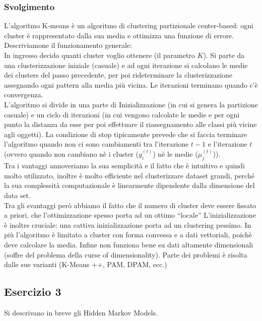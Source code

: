 \documentclass{article}
\begin{document}
\subsubsection*{Svolgimento}
L'algoritmo K-means è un algoritmo di clustering partizionale center-based: ogni cluster è rappresentato dalla sua media e ottimizza una funzione di errore. Descriviamone il funzionamento generale:\\
In ingresso decido quanti cluster voglio ottenere (il parametro $K$). Si parte da una clusterizzazione iniziale (casuale) e ad ogni iterazione si calcolano le medie dei clusters del passo precedente, per poi rideterminare la clusterizzazione assegnando ogni pattern alla media più vicina. Le iterazioni terminano quando c'è convergenza. \\
L'algoritmo si divide in una parte di Inizializzazione (in cui si genera la partizione casuale) e un ciclo di iterazioni (in cui vengono calcolate le medie e per ogni punto la distanza da esse per poi effettuare il riassegnamento alle classi più vicine agli oggetti). La condizione di stop tipicamente prevede che si faccia terminare l'algoritmo quando non ci sono cambiamenti tra l'iterazione $t-1$ e l'iterazione $t$ (ovvero quando non cambiano nè i cluster ($y_i^{(t)}$) nè le medie ($\mu_j^{(t)}$)).\\
Tra i vantaggi annoveriamo la sua semplicità e il fatto che è intuitivo e quindi molto utilizzato, inoltre è molto efficiente nel clusterizzare dataset grandi, perché la sua complessità computazionale è linearmente dipendente dalla dimensione del data set.\\
Tra gli svantaggi però abbiamo il fatto che il numero di cluster deve essere fissato a priori, che l'ottimizzazione spesso porta ad un ottimo “locale”
L'inizializzazione è inoltre cruciale: una cattiva inizializzazione porta ad un clustering pessimo. In più l'algoritmo è limitato a cluster con forma convessa e a dati vettoriali, poichè deve calcolare la media. Infine non funziona bene su dati altamente dimensionali (soffre del problema della curse of dimensionality). Parte dei problemi è risolta dalle sue varianti (K-Means ++, PAM, DPAM, ecc.)

\subsection*{Esercizio 3}
Si descrivano in breve gli Hidden Markov Models.
\end{document}
